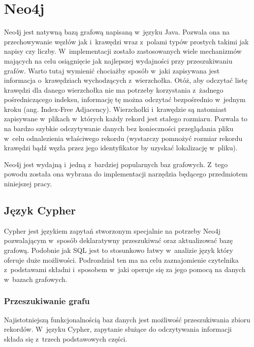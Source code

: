 \documentclass{xmgr}
\begin{document}
\chapter{Neo4j}

Neo4j jest natywną bazą grafową napisaną w~języku Java. Pozwala ona na przechowywanie węzłów jak i~krawędzi wraz z~polami typów prostych takimi jak napisy czy liczby. W~implementacji zostało zastosowanych wiele mechanizmów mających na celu osiągnięcie jak najlepszej wydajności przy przeszukiwaniu grafów. Warto tutaj wymienić chociażby sposób w~jaki zapisywana jest informacja o~krawędziach wychodzących z~wierzchołka. Otóż, aby odczytać listę krawędzi dla danego wierzchołka nie ma potrzeby korzystania z~żadnego pośredniczącego indeksu, informację tę można odczytać bezpośrednio w~jednym kroku (ang. Index-Free Adjacency\cite[s.~5]{Robinson:2013:GD}). Wierzchołki i~krawędzie są natomiast zapisywane w~plikach w~których każdy rekord jest stałego rozmiaru. Pozwala to na bardzo szybkie odczytywanie danych bez konieczności przeglądania pliku w~celu odnalezienia właściwego rekordu (wystarczy pomnożyć rozmiar rekordu krawędzi bądź węzła przez jego identyfikator by uzyskać lokalizację w~pliku).

Neo4j jest wydajną i~jedną z~bardziej popularnych baz grafowych. Z~tego powodu została ona wybrana do implementacji narzędzia będącego przedmiotem niniejszej pracy.

\section{Język Cypher}
Cypher jest językiem zapytań stworzonym specjalnie na potrzeby Neo4j pozwalającym w~sposób deklaratywny przeszukiwać oraz aktualizować bazę grafową. Podobnie jak SQL jest to stosunkowo łatwy w~analizie język który oferuje duże możliwości. Podrozdział ten ma na celu zaznajomienie czytelnika z~podstawami składni i~sposobem w~jaki operuje się za jego pomocą na danych w~bazach grafowych.

\newpage

\subsection{Przeszukiwanie grafu}

Najistotniejszą funkcjonalnością baz danych jest możliwość przeszukiwania zbioru rekordów. W~języku Cypher, zapytanie służące do odczytywania informacji składa się z~trzech podstawowych części.
\end{document}
